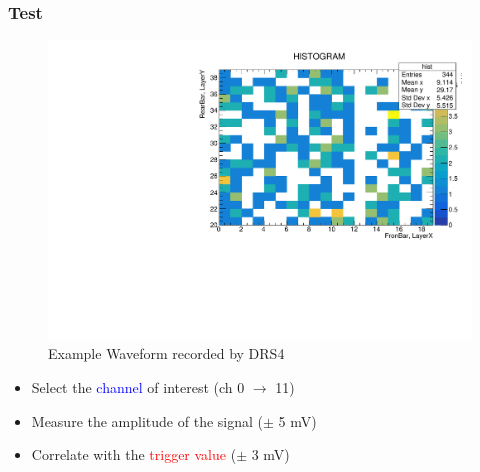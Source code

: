 \begin{frame} [fragile]
\small
	\frametitle{Test}
    		\begin{figure}
		 \centering
			\includegraphics[scale=0.30]{figures/0.20.pdf}
			\caption{Example Waveform recorded by DRS4}
		\end{figure}
	\begin{itemize}
		\item Select the \textcolor{blue}{channel} of interest (ch 0 $\longrightarrow$ 11)
		\item Measure the amplitude of the signal ($\pm$ 5 mV)
		\item Correlate with the \textcolor{red}{trigger value}  ($\pm$ 3 mV)
	\end{itemize}  
\end{frame}
